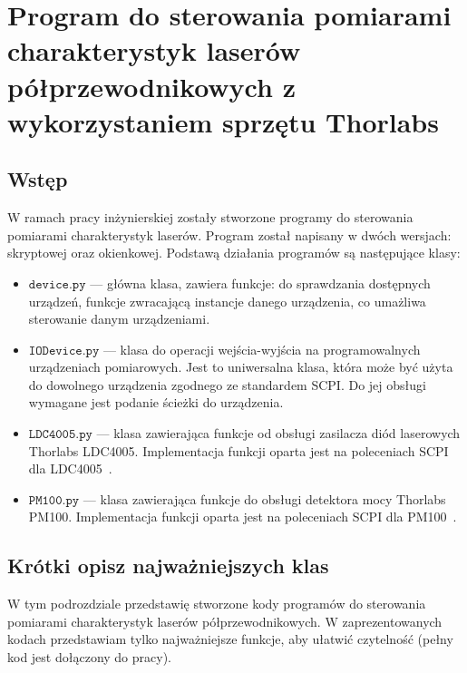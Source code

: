 \chapter{Program do sterowania pomiarami charakterystyk laserów półprzewodnikowych z wykorzystaniem sprzętu Thorlabs}
\section{Wstęp}
W ramach pracy inżynierskiej zostały stworzone programy do sterowania pomiarami charakterystyk laserów.
Program został napisany w dwóch wersjach: skryptowej oraz okienkowej. Podstawą działania programów są następujące klasy:
\begin{itemize}
\item $\mathtt{device.py}$ --- główna klasa, zawiera funkcje: do sprawdzania dostępnych urządzeń,
funkcje zwracającą instancje danego urządzenia, co umażliwa sterowanie danym urządzeniami.
\item $\mathtt{IODevice.py}$ --- klasa do operacji wejścia-wyjścia na programowalnych urządzeniach pomiarowych. Jest to
uniwersalna klasa, która może być użyta do dowolnego urządzenia zgodnego ze standardem SCPI. Do jej obsługi wymagane jest
podanie ścieżki do urządzenia.
\item $\mathtt{LDC4005.py}$ --- klasa zawierająca funkcje od obsługi zasilacza diód laserowych Thorlabs LDC4005. Implementacja
funkcji oparta jest na poleceniach SCPI dla LDC4005~\cite{Ldc_book_prog}.
\item $\mathtt{PM100.py}$ --- klasa zawierająca funkcje do obsługi detektora mocy Thorlabs PM100. Implementacja
funkcji oparta jest na poleceniach SCPI dla PM100~\cite{Pm100_book}.
\end{itemize}
\section{Krótki opisz najważniejszych klas}
W tym podrozdziale przedstawię stworzone kody programów do sterowania pomiarami charakterystyk laserów półprzewodnikowych.
 W zaprezentowanych kodach przedstawiam tylko najważniejsze funkcje, aby ułatwić czytelność (pełny kod jest dołączony do pracy).

